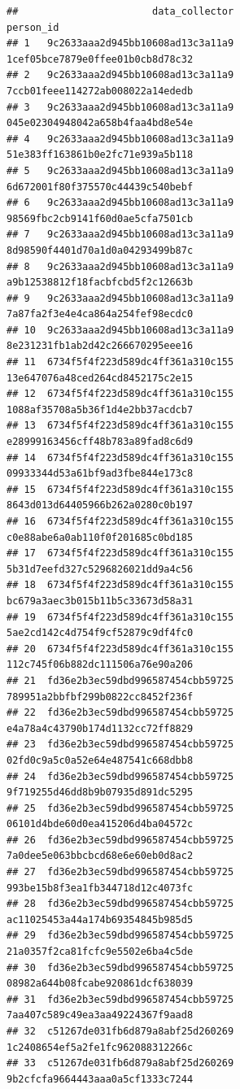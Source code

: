 \documentclass[]{article}
\begin{document}
\begin{verbatim}
##                       data_collector                          person_id
## 1   9c2633aaa2d945bb10608ad13c3a11a9   1cef05bce7879e0ffee01b0cb8d78c32
## 2   9c2633aaa2d945bb10608ad13c3a11a9   7ccb01feee114272ab008022a14ededb
## 3   9c2633aaa2d945bb10608ad13c3a11a9   045e02304948042a658b4faa4bd8e54e
## 4   9c2633aaa2d945bb10608ad13c3a11a9   51e383ff163861b0e2fc71e939a5b118
## 5   9c2633aaa2d945bb10608ad13c3a11a9   6d672001f80f375570c44439c540bebf
## 6   9c2633aaa2d945bb10608ad13c3a11a9   98569fbc2cb9141f60d0ae5cfa7501cb
## 7   9c2633aaa2d945bb10608ad13c3a11a9   8d98590f4401d70a1d0a04293499b87c
## 8   9c2633aaa2d945bb10608ad13c3a11a9   a9b12538812f18facbfcbd5f2c12663b
## 9   9c2633aaa2d945bb10608ad13c3a11a9   7a87fa2f3e4e4ca864a254fef98ecdc0
## 10  9c2633aaa2d945bb10608ad13c3a11a9   8e231231fb1ab2d42c266670295eee16
## 11  6734f5f4f223d589dc4ff361a310c155   13e647076a48ced264cd8452175c2e15
## 12  6734f5f4f223d589dc4ff361a310c155   1088af35708a5b36f1d4e2bb37acdcb7
## 13  6734f5f4f223d589dc4ff361a310c155   e28999163456cff48b783a89fad8c6d9
## 14  6734f5f4f223d589dc4ff361a310c155   09933344d53a61bf9ad3fbe844e173c8
## 15  6734f5f4f223d589dc4ff361a310c155   8643d013d64405966b262a0280c0b197
## 16  6734f5f4f223d589dc4ff361a310c155   c0e88abe6a0ab110f0f201685c0bd185
## 17  6734f5f4f223d589dc4ff361a310c155   5b31d7eefd327c5296826021dd9a4c56
## 18  6734f5f4f223d589dc4ff361a310c155   bc679a3aec3b015b11b5c33673d58a31
## 19  6734f5f4f223d589dc4ff361a310c155   5ae2cd142c4d754f9cf52879c9df4fc0
## 20  6734f5f4f223d589dc4ff361a310c155   112c745f06b882dc111506a76e90a206
## 21  fd36e2b3ec59dbd996587454cbb59725   789951a2bbfbf299b0822cc8452f236f
## 22  fd36e2b3ec59dbd996587454cbb59725   e4a78a4c43790b174d1132cc72ff8829
## 23  fd36e2b3ec59dbd996587454cbb59725   02fd0c9a5c0a52e64e487541c668dbb8
## 24  fd36e2b3ec59dbd996587454cbb59725   9f719255d46dd8b9b07935d891dc5295
## 25  fd36e2b3ec59dbd996587454cbb59725   06101d4bde60d0ea415206d4ba04572c
## 26  fd36e2b3ec59dbd996587454cbb59725   7a0dee5e063bbcbcd68e6e60eb0d8ac2
## 27  fd36e2b3ec59dbd996587454cbb59725   993be15b8f3ea1fb344718d12c4073fc
## 28  fd36e2b3ec59dbd996587454cbb59725   ac11025453a44a174b69354845b985d5
## 29  fd36e2b3ec59dbd996587454cbb59725   21a0357f2ca81fcfc9e5502e6ba4c5de
## 30  fd36e2b3ec59dbd996587454cbb59725   08982a644b08fcabe920861dcf638039
## 31  fd36e2b3ec59dbd996587454cbb59725   7aa407c589c49ea3aa49224367f9aad8
## 32  c51267de031fb6d879a8abf25d260269   1c2408654ef5a2fe1fc962088312266c
## 33  c51267de031fb6d879a8abf25d260269   9b2cfcfa9664443aaa0a5cf1333c7244

\end{verbatim}
\end{document}
